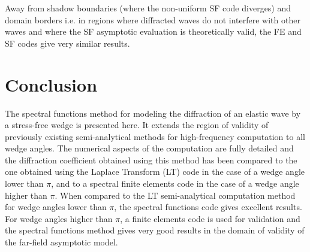 Away from shadow boundaries (where the non-uniform SF code diverges) and domain borders i.e. in regions where diffracted waves do not interfere with other waves and where the SF asymptotic evaluation is theoretically valid, the FE and SF codes give very similar results. %

\section*{Conclusion}
The spectral functions method for modeling the diffraction of an elastic wave by a stress-free wedge is presented here. It extends the region of validity of previously existing semi-analytical methods for high-frequency computation to all wedge angles. The numerical aspects of the computation are fully detailed and the diffraction coefficient obtained using this method has been compared to the one obtained using the Laplace Transform (LT) code in the case of a wedge angle lower than $\pi$, and to a spectral finite elements code in the case of a wedge angle higher than $\pi$. 
When compared to the LT semi-analytical computation method for wedge angles lower than $\pi$, the spectral functions code gives excellent results. For wedge angles higher than $\pi$, a finite elements code is used for validation and the spectral functions method gives very good results in the domain of validity of the far-field asymptotic model. %
